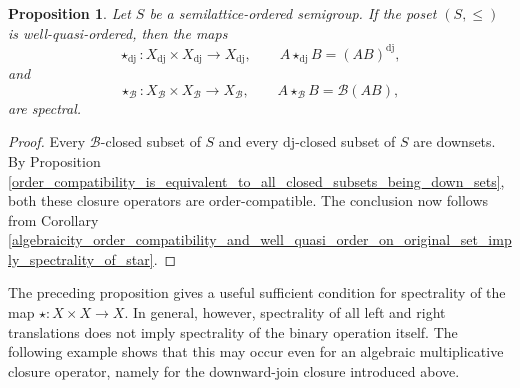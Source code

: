 \documentclass[10pt, reqno]{amsart}
\theoremstyle{plain}
\newtheorem{prop}[theorem]{Proposition}
\theoremstyle{definition}
\begin{document}
\begin{prop}
    Let $S$ be a semilattice-ordered semigroup. If the poset $(S, \leqslant)$ is well-quasi-ordered, then the maps $$\star_\mathrm{dj} : X_\mathrm{dj} \times X_\mathrm{dj} \rightarrow X_\mathrm{dj}, \qquad A \star_\mathrm{dj} B = (AB)^\mathrm{dj},$$ and $$\star_\mathcal{B} : X_\mathcal{B} \times X_\mathcal{B} \rightarrow X_\mathcal{B}, \qquad A \star_\mathcal{B} B = \mathcal{B}(AB),$$ are spectral. 
\end{prop}
\begin{proof}
    Every $\mathcal{B}$-closed subset of $S$ and every $\mathrm{dj}$-closed subset of $S$ are downsets. By Proposition \ref{order_compatibility_is_equivalent_to_all_closed_subsets_being_down_sets}, both these closure operators are order-compatible. The conclusion now follows from Corollary \ref{algebraicity_order_compatibility_and_well_quasi_order_on_original_set_imply_spectrality_of_star}. 
\end{proof}
The preceding proposition gives a useful sufficient condition for spectrality of the map $\star: X \times X \to X$. In general, however, spectrality of all left and right translations does not imply spectrality of the binary operation itself. The following example shows that this may occur even for an algebraic multiplicative closure operator, namely for the downward-join closure introduced above. 
\end{document}
